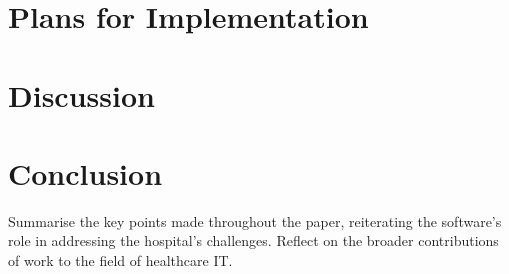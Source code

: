 \documentclass[11pt]{article}
\begin{document}
\section{Plans for Implementation}


\section{Discussion}

\section{Conclusion}
Summarise the key points made throughout the paper, reiterating the software's role in addressing the hospital's challenges.
Reflect on the broader contributions of work to the field of healthcare IT.



\end{document}
